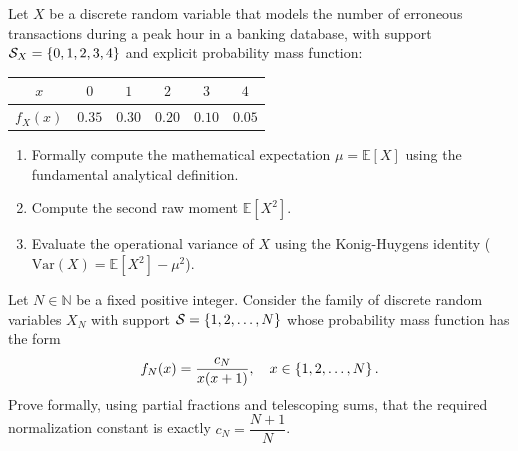 \begin{problema}
	\label{prob:c324c4f}
	Let $X$ be a discrete random variable that models the number of erroneous transactions during a peak hour in a banking database, with support $\mathcal{S}_X = \left\{ 0, 1, 2, 3, 4 \right\}$ and explicit probability mass function:
	\begin{center}
		\begin{tabular}{c|ccccc}
			\hline
			$x$ & $0$ & $1$ & $2$ & $3$ & $4$ \\
			\hline
			$f_X(x)$ & $0.35$ & $0.30$ & $0.20$ & $0.10$ & $0.05$ \\
			\hline
		\end{tabular}
	\end{center}
	\begin{enumerate}
		\item Formally compute the mathematical expectation $\mu = \mathbb{E}[X]$ using the fundamental analytical definition.
		\item Compute the second raw moment $\mathbb{E}[X^2]$.
		\item Evaluate the operational variance of $X$ using the Konig-Huygens identity ($\text{Var}(X) = \mathbb{E}[X^2] - \mu^2$).
	\end{enumerate}
\end{problema}

\begin{problema}
	\label{prob:cb2247c}
	Let $N \in \mathbb{N}$ be a fixed positive integer. Consider the family of discrete random variables $X_N$ with support $\mathcal{S} = \left\{ 1, 2, \dots, N \right\}$ whose probability mass function has the form
	\begin{align*}
		f_N(x) = \frac{c_N}{x(x+1)}, \quad x \in \left\{ 1, 2, \dots, N \right\}.
	\end{align*}
	Prove formally, using partial fractions and telescoping sums, that the required normalization constant is exactly $c_N = \dfrac{N+1}{N}$.
\end{problema}

